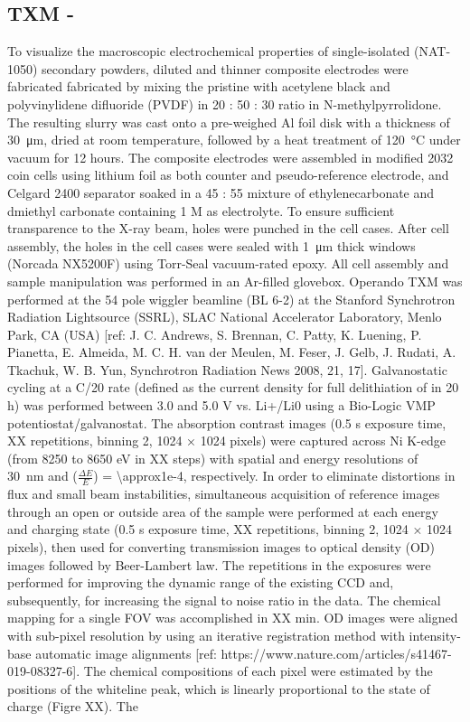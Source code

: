 \documentclass{article}
\begin{document}
\subsection{TXM - \nca{}}
To visualize the macroscopic electrochemical properties of single-isolated \nca{} (NAT-1050) secondary powders, diluted and thinner composite electrodes were fabricated fabricated by mixing the pristine \nca{} with acetylene black and polyvinylidene difluoride (PVDF) in 20 : 50 : 30 ratio in N-methylpyrrolidone. The resulting slurry was cast onto a pre-weighed Al foil disk with a thickness of \SI{30}{\micro\meter}, dried at room temperature, followed by a heat treatment of \SI{120}{\celsius} under vacuum for 12 hours. The composite electrodes were assembled in modified 2032 coin cells using lithium foil as both counter and pseudo-reference electrode, and Celgard 2400 separator soaked in a 45 : 55 mixture of ethylenecarbonate and dmiethyl carbonate containing 1 M  as electrolyte. To ensure sufficient transparence to the X-ray beam, holes were punched in the cell cases. After cell assembly, the holes in the cell cases  were sealed with \SI{1}{\micro\meter} thick  windows (Norcada NX5200F) using Torr-Seal vacuum-rated epoxy. All cell assembly and sample manipulation was performed in an Ar-filled glovebox. Operando TXM was performed at the 54 pole wiggler beamline (BL 6-2) at the Stanford Synchrotron Radiation Lightsource (SSRL), SLAC National Accelerator Laboratory, Menlo Park, CA (USA) [ref: J. C. Andrews, S. Brennan, C. Patty, K. Luening, P. Pianetta, E. Almeida, M. C. H. van der Meulen, M. Feser, J. Gelb, J. Rudati, A. Tkachuk, W. B. Yun, Synchrotron Radiation News 2008, 21, 17]. Galvanostatic cycling at a C/20 rate (defined as the current density for full delithiation of \nca{} in 20 h) was performed between 3.0 and 5.0 V vs. Li+/Li0 using a Bio-Logic VMP potentiostat/galvanostat. The absorption contrast images (0.5 s exposure time, XX repetitions, binning 2, 1024 × 1024 pixels) were captured across Ni K-edge (from 8250 to 8650 eV in XX steps) with spatial and energy resolutions of ~ \SI{30}{\nano\meter} and ($\frac{\Delta E}{E}$) = \num{\approx1e-4}, respectively. In order to eliminate distortions in flux and small beam instabilities, simultaneous acquisition of reference images through an open or outside area of the sample were performed at each energy and charging state (0.5 s exposure time, XX repetitions, binning 2, 1024 × 1024 pixels), then used for converting transmission images to optical density (OD) images followed by Beer-Lambert law. The repetitions in the exposures were performed for improving the dynamic range of the existing CCD and, subsequently, for increasing the signal to noise ratio in the data. The chemical mapping for a single FOV was accomplished in XX min. OD images were aligned with sub-pixel resolution by using an iterative registration method with intensity-base automatic image alignments [ref: https://www.nature.com/articles/s41467-019-08327-6]. The chemical compositions of each pixel were estimated by the positions of the whiteline peak, which is linearly proportional to the state of charge (Figre XX). The 
\end{document}
